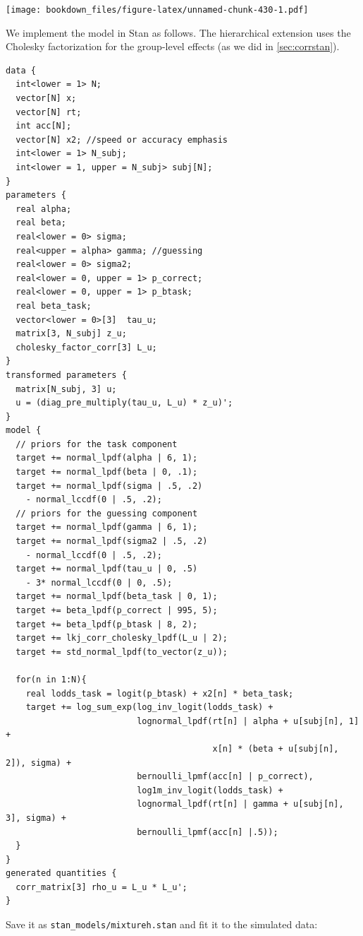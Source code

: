 \documentclass[12pt,]{krantz}
\theoremstyle{definition}
\theoremstyle{definition}
\theoremstyle{definition}
\theoremstyle{remark}
\begin{document}
\texttt{[image: bookdown\_files/figure-latex/unnamed-chunk-430-1.pdf]}

We implement the model in Stan as follows. The hierarchical extension
uses the Cholesky factorization for the group-level effects (as we did
in \ref{sec:corrstan}).

\begin{verbatim}
data {
  int<lower = 1> N;
  vector[N] x;
  vector[N] rt;
  int acc[N];
  vector[N] x2; //speed or accuracy emphasis
  int<lower = 1> N_subj;
  int<lower = 1, upper = N_subj> subj[N];
}
parameters {
  real alpha;
  real beta;
  real<lower = 0> sigma;
  real<upper = alpha> gamma; //guessing
  real<lower = 0> sigma2;
  real<lower = 0, upper = 1> p_correct;
  real<lower = 0, upper = 1> p_btask;
  real beta_task;
  vector<lower = 0>[3]  tau_u;   
  matrix[3, N_subj] z_u;
  cholesky_factor_corr[3] L_u;
}
transformed parameters {
  matrix[N_subj, 3] u;
  u = (diag_pre_multiply(tau_u, L_u) * z_u)';
}
model {
  // priors for the task component
  target += normal_lpdf(alpha | 6, 1);
  target += normal_lpdf(beta | 0, .1);
  target += normal_lpdf(sigma | .5, .2)
    - normal_lccdf(0 | .5, .2);
  // priors for the guessing component
  target += normal_lpdf(gamma | 6, 1);
  target += normal_lpdf(sigma2 | .5, .2)
    - normal_lccdf(0 | .5, .2);
  target += normal_lpdf(tau_u | 0, .5)
    - 3* normal_lccdf(0 | 0, .5);
  target += normal_lpdf(beta_task | 0, 1);
  target += beta_lpdf(p_correct | 995, 5);
  target += beta_lpdf(p_btask | 8, 2);
  target += lkj_corr_cholesky_lpdf(L_u | 2);
  target += std_normal_lpdf(to_vector(z_u));

  for(n in 1:N){
    real lodds_task = logit(p_btask) + x2[n] * beta_task;
    target += log_sum_exp(log_inv_logit(lodds_task) +
                          lognormal_lpdf(rt[n] | alpha + u[subj[n], 1] +
                                         x[n] * (beta + u[subj[n], 2]), sigma) +
                          bernoulli_lpmf(acc[n] | p_correct),
                          log1m_inv_logit(lodds_task) +
                          lognormal_lpdf(rt[n] | gamma + u[subj[n], 3], sigma) +
                          bernoulli_lpmf(acc[n] |.5));
  }
}
generated quantities {
  corr_matrix[3] rho_u = L_u * L_u';
}
\end{verbatim}

Save it as \texttt{stan\_models/mixtureh.stan} and fit it to the
simulated data:
\end{document}
